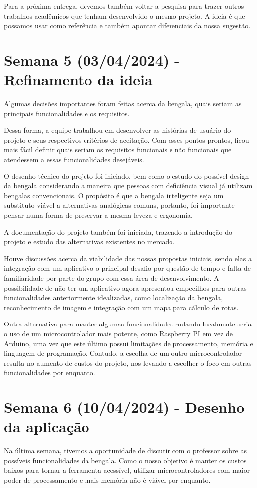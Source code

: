 Para a próxima entrega, devemos também voltar a pesquisa para trazer outros trabalhos acadêmicos que tenham desenvolvido o mesmo projeto. A ideia é que possamos usar como referência e também apontar diferenciais da nossa sugestão.



\section{Semana 5 (03/04/2024)  - Refinamento da ideia }
Algumas decisões importantes foram feitas acerca da bengala, quais seriam as principais funcionalidades e os requisitos. 

Dessa forma, a equipe trabalhou em desenvolver as histórias de usuário do projeto e seus respectivos critérios de aceitação. Com esses pontos prontos, ficou mais fácil definir quais seriam os requisitos funcionais e não funcionais que atendessem a essas funcionalidades desejáveis. 

O desenho técnico do projeto foi iniciado, bem como o estudo do possível design da bengala considerando a maneira que pessoas com deficiência visual já utilizam bengalas convencionais. O propósito é que a bengala inteligente seja um substituto viável a alternativas analógicas comuns, portanto, foi importante pensar numa forma de preservar a mesma leveza e ergonomia.

A documentação do projeto também foi iniciada, trazendo a introdução do projeto e estudo das alternativas existentes no mercado. 

Houve discussões acerca da viabilidade das nossas propostas iniciais, sendo elas a integração com um aplicativo o principal desafio por questão de tempo e falta de familiaridade por parte do grupo com essa área de desenvolvimento. A possibilidade de não ter um aplicativo agora apresentou empecilhos para outras funcionalidades anteriormente idealizadas, como localização da bengala, reconhecimento de imagem e integração com um mapa para cálculo de rotas. 

Outra alternativa para manter algumas funcionalidades rodando localmente seria o uso de um microcontrolador mais potente, como Raspberry PI em vez de Arduino, uma vez que este último possui limitações de processamento, memória e linguagem de programação. Contudo, a escolha de um outro microcontrolador resulta no aumento de custos do projeto, nos levando a escolher o foco em outras funcionalidades por enquanto.


\section{Semana 6 (10/04/2024) - Desenho da aplicação }
 Na última semana, tivemos a oportunidade de discutir com o professor sobre as possíveis funcionalidades da bengala. Como o nosso objetivo é manter os custos baixos para tornar a ferramenta acessível, utilizar microcontroladores com maior poder de processamento e mais memória não é viável por enquanto.

